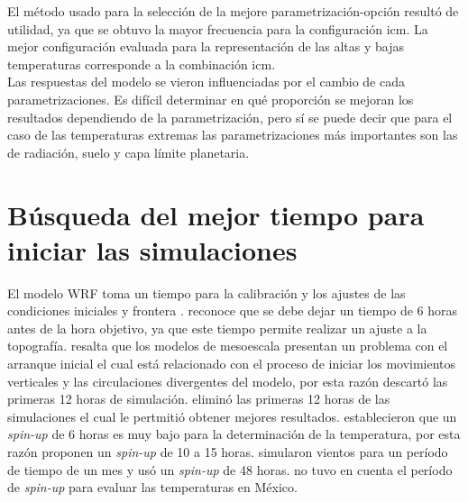 \begin{itemize}


El método usado para la selección de la mejore parametrización-opción resultó de utilidad, ya que se obtuvo la mayor frecuencia para la configuración icm. La mejor configuración evaluada para la representación de las altas y bajas temperaturas corresponde a la combinación icm.\\

Las respuestas del modelo se vieron influenciadas por el cambio de cada parametrizaciones. Es difícil determinar en qué proporción se mejoran los resultados dependiendo de la parametrización, pero sí se puede decir que para el caso de las temperaturas extremas las parametrizaciones más importantes son las de radiación, suelo y capa límite planetaria.\\


\end{itemize}


\section{Búsqueda del mejor tiempo para iniciar las simulaciones}

El modelo WRF toma un tiempo para la calibración y los ajustes de las condiciones iniciales y frontera \citep{Jimenez2014}. \citet{Skamarock2008} reconoce que se debe dejar un tiempo de 6 horas antes de la hora objetivo, ya que este tiempo permite realizar un ajuste a la topografía. \citet{cortes2010} resalta que los modelos de mesoescala presentan un problema con el arranque inicial el cual está relacionado con el proceso de iniciar los movimientos verticales y las circulaciones divergentes del modelo, por esta razón \citet{cortes2010} descartó las primeras 12 horas de simulación. \citet{Hu2010} eliminó las primeras 12 horas de las simulaciones el cual le pertmitió obtener mejores resultados. \citet{Arango2011} establecieron que un \textit{spin-up} de 6 horas es muy bajo para la determinación de la temperatura, por esta razón proponen un \textit{spin-up} de 10 a 15 horas. \citet{Draxl2007} simularon vientos para un período de tiempo de un mes y usó un \textit{spin-up} de 48 horas. \citet{Corrales2015} no tuvo en cuenta el período de \textit{spin-up} para evaluar las temperaturas en México.\\

